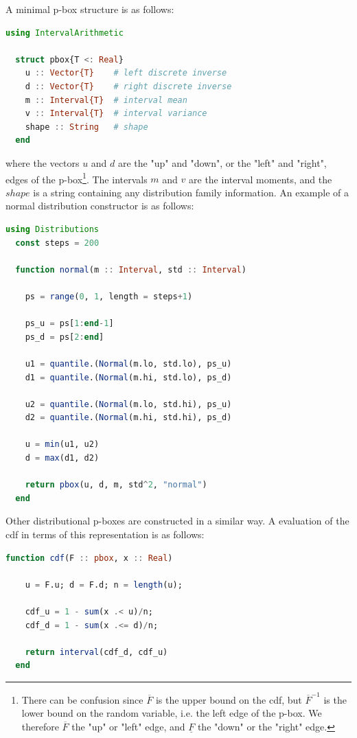 \documentclass{juliacon}
\begin{document}
A minimal p-box structure is as follows:

\begin{lstlisting}[language = Julia]
  using IntervalArithmetic

  struct pbox{T <: Real}
    u :: Vector{T}    # left discrete inverse
    d :: Vector{T}    # right discrete inverse
    m :: Interval{T}  # interval mean
    v :: Interval{T}  # interval variance
    shape :: String   # shape
  end
\end{lstlisting}

\noindent where the vectors $u$ and $d$ are the "up" and "down", or the "left" and "right", edges of the p-box\footnote{There can be confusion since $\overline{F}$ is the upper bound on the cdf, but $\overline{F}^{-1}$ is the lower bound on the random variable, i.e. the left edge of the p-box. We therefore $\overline{F}$ the "up" or "left" edge, and $\underline{F}$ the "down" or the "right" edge.}. The intervals $m$ and $v$ are the interval moments, and the $shape$ is a string containing any distribution family information. An example of a normal distribution constructor is as follows:


\begin{lstlisting}[language = Julia]
  using Distributions
  const steps = 200

  function normal(m :: Interval, std :: Interval)

    ps = range(0, 1, length = steps+1)

    ps_u = ps[1:end-1]
    ps_d = ps[2:end]

    u1 = quantile.(Normal(m.lo, std.lo), ps_u)
    d1 = quantile.(Normal(m.hi, std.lo), ps_d)

    u2 = quantile.(Normal(m.lo, std.hi), ps_u)
    d2 = quantile.(Normal(m.hi, std.hi), ps_d)

    u = min(u1, u2)
    d = max(d1, d2)

    return pbox(u, d, m, std^2, "normal")
  end

\end{lstlisting}

Other distributional p-boxes are constructed in a similar way. A evaluation of the cdf in terms of this representation is as follows: 

\begin{lstlisting}[language = Julia]
  function cdf(F :: pbox, x :: Real)
    
    u = F.u; d = F.d; n = length(u);
    
    cdf_u = 1 - sum(x .< u)/n;
    cdf_d = 1 - sum(x .<= d)/n;
    
    return interval(cdf_d, cdf_u)
  end

\end{lstlisting}
\end{document}
